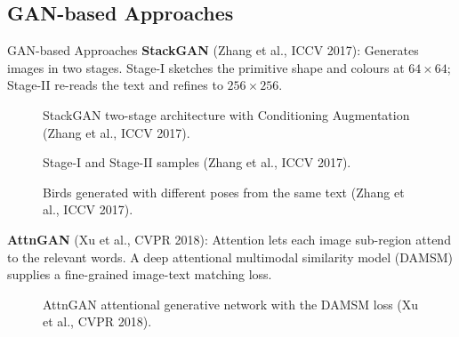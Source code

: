 \subsection{GAN-based Approaches}
\begin{frame}[allowframebreaks]{GAN-based Approaches}
    \textbf{StackGAN} (Zhang et al., ICCV 2017): Generates images in two stages. Stage-I sketches the primitive shape and colours at $64\times64$; Stage-II re-reads the text and refines to $256\times256$.
    \begin{figure}
        \centering
        \caption*{StackGAN two-stage architecture with Conditioning Augmentation (Zhang et al., ICCV 2017).}
    \end{figure}
\framebreak
    \begin{figure}
        \centering
        \caption*{Stage-I and Stage-II samples (Zhang et al., ICCV 2017).}
    \end{figure}
\framebreak
    \begin{figure}
        \centering
        \caption*{Birds generated with different poses from the same text (Zhang et al., ICCV 2017).}
    \end{figure}
\framebreak
    \textbf{AttnGAN} (Xu et al., CVPR 2018): Attention lets each image sub-region attend to the relevant words. A deep attentional multimodal similarity model (DAMSM) supplies a fine-grained image-text matching loss.
    \begin{figure}
        \centering
        \caption*{AttnGAN attentional generative network with the DAMSM loss (Xu et al., CVPR 2018).}
    \end{figure}
\framebreak
    \begin{figure}
        \centering

\end{figure}
\end{frame}
